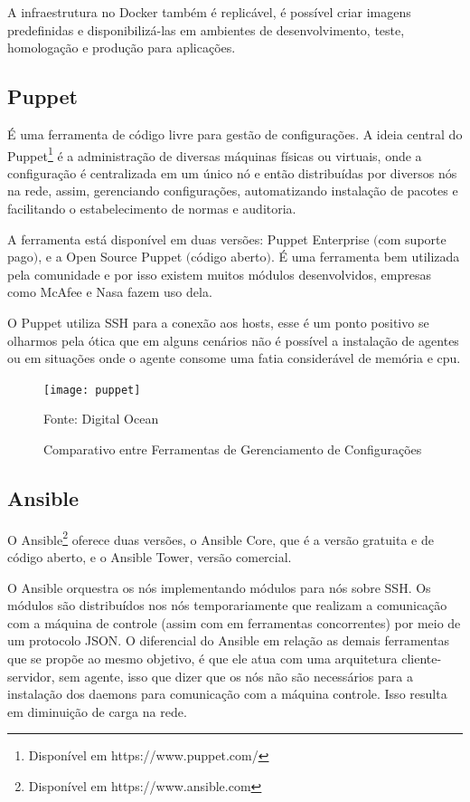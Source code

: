A infraestrutura no Docker também é replicável, é possível criar imagens predefinidas e disponibilizá-las em ambientes de desenvolvimento, teste, homologação e produção para aplicações.

\subsection{Puppet}
É uma ferramenta de código livre para gestão de configurações. A ideia central do Puppet\footnote{Disponível em https://www.puppet.com/} é a administração de diversas máquinas físicas ou virtuais, onde a configuração é centralizada em um único nó e então distribuídas por diversos nós na rede, assim, gerenciando configurações, automatizando instalação de pacotes e facilitando o estabelecimento de normas e auditoria.

A ferramenta está disponível em duas versões: Puppet Enterprise $($com suporte pago$)$, e a Open Source Puppet $($código aberto$)$. É uma ferramenta bem utilizada pela comunidade e por isso existem muitos módulos desenvolvidos, empresas como McAfee e Nasa fazem uso dela.

O Puppet utiliza SSH para a conexão aos hosts, esse é um ponto positivo se olharmos pela ótica que em alguns cenários não é possível a instalação de agentes ou em situações onde o agente consome uma fatia considerável de memória e cpu.



\begin{figure} [htb]
	\centering
	\texttt{[image: puppet]}
	\caption{Comparativo entre Ferramentas de Gerenciamento de Configurações}
	Fonte: Digital Ocean
	\label{fig:puppet}
\end{figure}


\subsection{Ansible}

O Ansible\footnote{Disponível em https://www.ansible.com} oferece duas versões, o Ansible Core, que é a versão gratuita e de código aberto, e o Ansible Tower, versão comercial.

O Ansible orquestra os nós implementando módulos para nós sobre SSH. Os módulos são distribuídos nos nós temporariamente que realizam a comunicação com a máquina de controle (assim com em ferramentas concorrentes) por meio de um protocolo JSON.
O diferencial do Ansible em relação as demais ferramentas que se propõe ao mesmo objetivo, é que ele atua com uma arquitetura cliente-servidor, sem agente,  isso que dizer que os nós não são necessários para a instalação dos daemons para comunicação com a máquina controle. Isso resulta em diminuição de carga na rede. 

